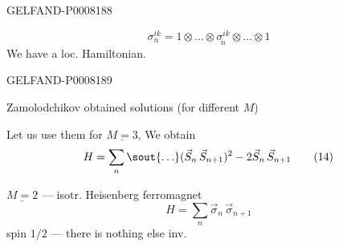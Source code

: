 \begin{GelfandAdjacentEvidence}{GELFAND-P000818}{8}

\[
\sigma_n^{ik}=1\otimes\ldots\otimes\underset{n}{\sigma^{ik}}\otimes\ldots\otimes1
\]
We have a loc. Hamiltonian.

\end{GelfandAdjacentEvidence}
\begin{GelfandAdjacentEvidence}{GELFAND-P000818}{9}


Zamolodchikov obtained  solutions (for different \(M\))

Let us use them for \(\underline{M=3}\), We obtain
\begin{equation*}
H=\sum_n\text{\sout{\(\ldots\)}}(\vec{S}_n\,\vec{S}_{n+1})^2-2\vec{S}_n\,\vec{S}_{n+1}\tag{14}
\end{equation*}
\end{GelfandAdjacentEvidence}


\(\underline{M=2}\) — isotr. Heisenberg ferromagnet
\begin{equation*}
H=\sum_n\vec{\sigma}_n\,\vec{\sigma}_{n+1}\tag{15}
\end{equation*}
spin \(1/2\) — there is nothing else inv.



